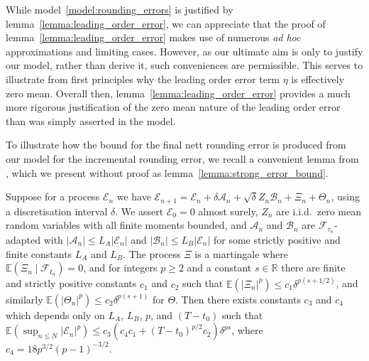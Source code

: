 \documentclass[manuscript,review]{acmart}
\begin{document}
While model~\ref{model:rounding_errors} is justified by lemma~\ref{lemma:leading_order_error}, we can appreciate that the proof of lemma~\ref{lemma:leading_order_error} makes use of numerous \textit{ad hoc} approximations and limiting cases. However, as our ultimate aim is only to justify our model, rather than derive it, such conveniences are permissible. This serves to illustrate from first principles why the leading order error term $ \eta $ is effectively zero mean. Overall then, lemma~\ref{lemma:leading_order_error} provides a much more rigorous justification of the zero mean nature of the leading order error than was simply asserted in the  \citet{arciniega2003rounding} model. 

To illustrate how the bound for the final nett rounding error is produced from our model for the incremental rounding error, we recall a convenient lemma from \citeauthor{giles2020approximate} \citep[lemma~4.3]{giles2020approximate} \citep[lemma~5.2.3]{sheridan2020nested}, which we present without proof as lemma~\ref{lemma:strong_error_bound}.

\begin{lemma}
\label{lemma:strong_error_bound}
Suppose for a process $ \mathcal{E}_n $ we have 
$ \mathcal{E}_{n+1} = \mathcal{E}_n + \delta \mathcal{A}_n + \sqrt{\delta} Z_n \mathcal{B}_n + \Xi_n + \Theta_n $,
using a discretisation interval $ \delta $. 
We assert $ \mathcal{E}_0 = 0 $ almost surely, $ Z_n $ are i.i.d.\ zero mean random variables with all finite moments bounded, and $ \mathcal{A}_n $ and $ \mathcal{B}_n $ are $ \mathcal{F}_{\tau_n} $-adapted with $ \lvert \mathcal{A}_n\rvert \leq L_A \lvert \mathcal{E}_n\rvert  $ and $ \lvert \mathcal{B}_n\rvert \leq L_B \lvert \mathcal{E}_n\rvert  $ for some strictly positive and finite constants $ L_A $ and $ L_B $. The process $ \Xi $ is a martingale where $ \mathbb{E}(\Xi_n\mid\mathcal{F}_{t_n}) = 0 $, and for integers $ p \geq 2 $  and a constant $ s \in \mathbb{R} $ there are finite and strictly positive constants $ c_1 $ and $ c_2 $ such that $ \mathbb{E}(\lvert\Xi_n\rvert^p) \leq c_1 \delta^{p(s + 1/2)} $, and similarly $ \mathbb{E}(\lvert\Theta_n\rvert^p) \leq c_2 \delta^{p(s + 1)} $ for $ \Theta $. Then there exists constants $ c_3 $ and $ c_4 $ which depends only on $ L_A $, $ L_B $, $ p $, and $ (T-t_0) $ such that 
$ \mathbb{E}(\sup_{n \leq N} \lvert\mathcal{E}_n\rvert^p) \leq c_3(c_4 c_1 + (T - t_0)^{p/2}c_2)\delta^{ps} $, 
where $ c_4 = 18p^{3/2}(p - 1)^{-3/2} $.
\end{lemma}
\end{document}

